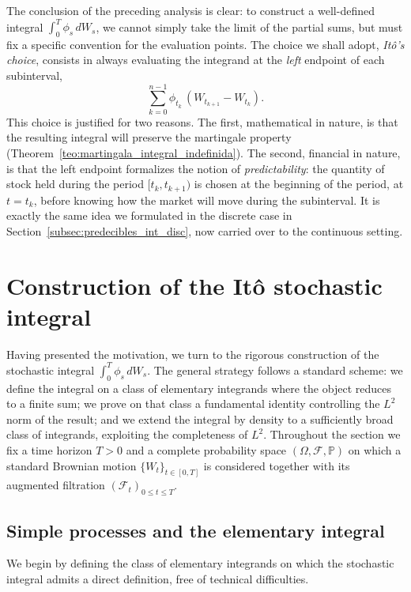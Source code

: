 \documentclass[11pt,a4paper,oneside]{report}
\theoremstyle{plain}
\theoremstyle{definition}
\theoremstyle{remark}
\newcommand{\PP}{\mathbb{P}}
\newcommand{\F}{\mathcal{F}}
\newcommand{\1}{\mathbf{1}}
\begin{document}
The conclusion of the preceding
analysis is clear: to construct a well-defined integral
$\int_0^T \phi_s\, dW_s$, we cannot simply take the limit of the
partial sums, but must fix a specific convention for the evaluation
points. The choice we shall adopt, \emph{Itô's choice}, consists in
always evaluating the integrand at the \emph{left} endpoint of each
subinterval,
\begin{equation*}
  \sum_{k=0}^{n-1} \phi_{t_k}\, (W_{t_{k+1}} - W_{t_k}).
\end{equation*}
This choice is justified for two reasons. The first, mathematical in
nature, is that the resulting integral will preserve the martingale
property (Theorem~\ref{teo:martingala_integral_indefinida}). The
second, financial in nature, is that the left endpoint formalizes the
notion of \emph{predictability}: the quantity of stock held during
the period $[t_k, t_{k+1})$ is chosen at the beginning of the period,
at $t = t_k$, before knowing how the market will move during the
subinterval. It is exactly the same idea we formulated in the
discrete case in Section~\ref{subsec:predecibles_int_disc}, now
carried over to the continuous setting.

\section{Construction of the Itô stochastic integral}
\label{sec:construccion_ito}

Having presented the motivation, we turn to the rigorous construction
of the stochastic integral $\int_0^T \phi_s\, dW_s$. The general
strategy follows a standard scheme: we define the integral on a class
of elementary integrands where the object reduces to a finite sum; we
prove on that class a fundamental identity controlling the $L^2$ norm
of the result; and we extend the integral by density to a
sufficiently broad class of integrands, exploiting the completeness
of $L^2$. Throughout the section we fix a time horizon $T > 0$ and a
complete probability space $(\Omega, \F, \PP)$ on which a standard
Brownian motion $\{W_t\}_{t \in [0, T]}$ is considered together with
its augmented filtration $(\F_t)_{0 \le t \le T}$.

\subsection{Simple processes and the elementary integral}
\label{subsec:integral_simples}

We begin by defining the class of elementary integrands on which the
stochastic integral admits a direct definition, free of technical
difficulties.
\end{document}
